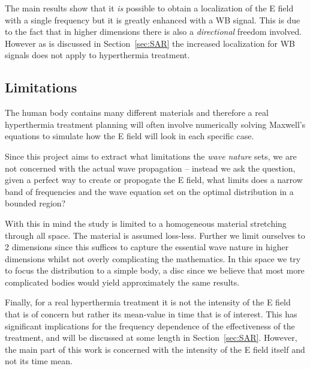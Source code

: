 \documentclass[11pt,a4paper, 
swedish,english %
]{article}
\begin{document}
The main results show that it \emph{is} possible to obtain a localization of the E field with a single frequency but it is greatly enhanced with a WB signal. This is due to the fact that in higher dimensions there is also a \emph{directional} freedom involved. However as is discussed in Section~\ref{sec:SAR} the increased localization for WB signals does not apply to hyperthermia treatment. 



\subsection{Limitations}
The human body contains many different materials and therefore a real hyperthermia treatment planning will often involve numerically solving Maxwell's equations to simulate how the E field will look in each specific case.

Since this project aims to extract what limitations the \emph{wave nature} sets, we are not concerned with the actual wave propagation -- instead we ask the question, given a perfect way to create or propogate the E field, what limits does a narrow band of frequencies and the wave equation set on the optimal distribution in a bounded region?

With this in mind the study is limited to a homogeneous material stretching through all space. The material is assumed loss-less. %
Further we limit ourselves to 2 dimensions since this suffices to capture the essential wave nature in higher dimensions whilst not overly complicating the mathematics. 
In this space we try to focus the distribution to a simple body, a disc since we believe that most more complicated bodies would yield approximately the same results.


Finally, for a real hyperthermia treatment it is not the intensity of the E field that is of concern but rather its mean-value in time that is of interest. This has significant implications for the frequency dependence of the effectiveness of the treatment, and will be discussed at some length in Section~\ref{sec:SAR}. However, the main part of this work is concerned with the intensity of the E field itself and not its time mean.
\end{document}

